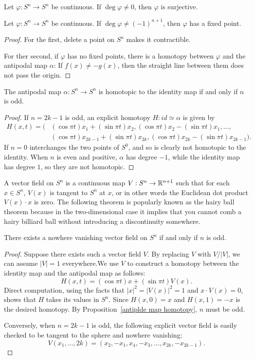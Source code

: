 \begin{theorem}
Let $\varphi:S^n\to S^n$ be continuous. If $\deg\varphi\neq 0$, then $\varphi$ is surjective.
\end{theorem}
\begin{theorem}\label{degree fix point}
Let $\varphi:S^n\to S^n$ be continuous. If $\deg\varphi\neq(-1)^{n+1}$, then $\varphi$ has a fixed point.
\end{theorem}
\begin{proof}
For the first, delete a point on $S^n$ makes it contractible.\par
For ther second, if $\varphi$ has no fixed points, there is a homotopy between $\varphi$ and the antipodal map $\alpha$: If $f(x)\neq-g(x)$, then the straight line between them does not pass the origin.
\end{proof}
\begin{proposition}\label{antiplde map homotopy}
The antipodal map $\alpha:S^n\to S^n$ is homotopic to the identity map if and only if $n$ is odd.
\end{proposition}
\begin{proof}
If $n=2k-1$ is odd, an explicit homotopy $H:id \simeq\alpha$ is given by
\begin{align*}
H(x,t)=\big(&(\cos\pi t)x_1+(\sin\pi t)x_2,(\cos\pi t)x_2-(\sin\pi t)x_1,\dots,\\
&(\cos\pi t)x_{2k-1}+(\sin\pi t)x_{2k},(\cos\pi t)x_{2k}-(\sin\pi t)x_{2k-1}\big).
\end{align*}
If $n=0$ interchanges the two points of $S^0$, and so is clearly not homotopic to the identity. When $n$ is even and positive, $\alpha$ has degree $-1$, while the identity map has degree $1$, so they are not homotopic.
\end{proof}
A vector field on $S^n$ is a continuous map $V:S^n\to\mathbb{R}^{n+1}$ such that for each $x\in S^n$, $V(x)$ is tangent to $S^n$ at $x$, or in other words the Euclidean dot product $V(x)\cdot x$ is zero. The following theorem is popularly known as the hairy ball theorem because in the two-dimensional case it implies that you cannot comb a hairy billiard ball without introducing a discontinuity somewhere.
\begin{theorem}
There exists a nowhere vanishing vector field on $S^n$ if and only if $n$ is odd.
\end{theorem}
\begin{proof}
Suppose there exists such a vector field $V$. By replacing $V$ with $V/|V|$, we can assume $|V|=1$ everywhere.We use $V$ to construct a homotopy between the identity map and the antipodal map as follows:
\[H(x,t)=(\cos\pi t)x+(\sin\pi t)V(x).\]
Direct computation, using the facts that $|x|^2=|V(x)|^2=1$ and $x\cdot V(x)=0$, shows that $H$ takes its values in $S^n$. Since $H(x,0)=x$ and $H(x,1)=-x$ is the desired homotopy. By Proposition~\ref{antiplde map homotopy}, $n$ must be odd.\par
Conversely, when $n=2k-1$ is odd, the following explicit vector field is easily checked to be tangent to the sphere and nowhere vanishing:
\[V(x_1,\dots,2k)=(x_2,-x_1,x_4,-x_3,\dots,x_{2k},-x_{2k-1}).\]
\end{proof}
